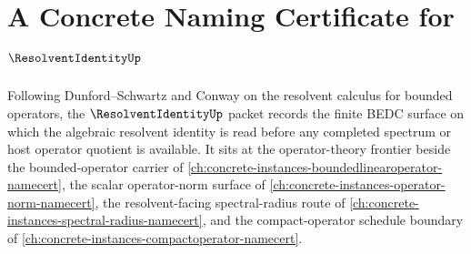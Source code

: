 \chapter{A Concrete Naming Certificate for $\ResolventIdentityUp$}
\label{ch:concrete-instances-resolvent-identity-namecert}

Following Dunford--Schwartz and Conway on the resolvent calculus for bounded operators, the $\ResolventIdentityUp$ packet records the finite BEDC surface on which the algebraic resolvent identity is read before any completed spectrum or host operator quotient is available. It sits at the operator-theory frontier beside the bounded-operator carrier of \autoref{ch:concrete-instances-boundedlinearoperator-namecert}, the scalar operator-norm surface of \autoref{ch:concrete-instances-operator-norm-namecert}, the resolvent-facing spectral-radius route of \autoref{ch:concrete-instances-spectral-radius-namecert}, and the compact-operator schedule boundary of \autoref{ch:concrete-instances-compactoperator-namecert}.

